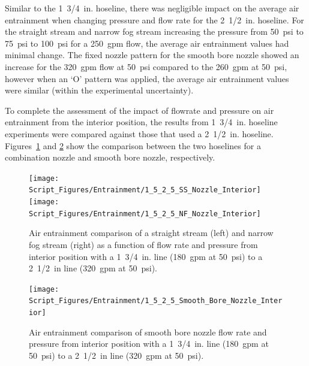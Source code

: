 \documentclass[12pt,oneside]{book}
\begin{document}
Similar to the 1~3/4~in. hoseline, there was negligible impact on the average air entrainment when changing pressure and flow rate for the 2~1/2~in. hoseline. For the straight stream and narrow fog stream increasing the pressure from 50~psi to 75~psi to 100~psi for a 250~gpm flow, the average air entrainment values had minimal change. The fixed nozzle pattern for the smooth bore nozzle showed an increase for the 320~gpm flow at 50~psi compared to the 260~gpm at 50~psi, however when an `O' pattern was applied, the average air entrainment values were similar (within the experimental uncertainty).

To complete the assessment of the impact of flowrate and pressure on air entrainment from the interior position, the results from 1~3/4~in. hoseline experiments were compared against those that used a 2~1/2~in. hoseline. Figures~\ref{fig:SS_NF_1_5_2_5_Int} and \ref{fig:SB_1_5_2_5_Int} show the comparison between the two hoselines for a combination nozzle and smooth bore nozzle, respectively.

\begin{figure}[!ht]
\centering
\texttt{[image: Script\_Figures/Entrainment/1\_5\_2\_5\_SS\_Nozzle\_Interior]}
\texttt{[image: Script\_Figures/Entrainment/1\_5\_2\_5\_NF\_Nozzle\_Interior]}
\caption[Air Entrainment Comparison of Interior Smooth Bore Nozzle from 1~3/4~in Line to 2~1/2~in. Line]{Air entrainment comparison of a straight stream (left) and narrow fog stream (right) as a function of flow rate and pressure from interior position with a 1~3/4~in. line (180~gpm at 50~psi) to a 2~1/2~in line (320~gpm at 50~psi).}
\label{fig:SS_NF_1_5_2_5_Int}
\end{figure}

\begin{figure}[!ht]
\centering
\texttt{[image: Script\_Figures/Entrainment/1\_5\_2\_5\_Smooth\_Bore\_Nozzle\_Interior]}
\caption[Air Entrainment Comparison of Interior Smooth Bore Nozzle from 1~3/4~in Line to 2~1/2~in. Line]{Air entrainment comparison of smooth bore nozzle flow rate and pressure from interior position with a 1~3/4~in. line (180~gpm at 50~psi) to a 2~1/2~in line (320~gpm at 50~psi).}
\label{fig:SB_1_5_2_5_Int}
\end{figure}

\end{document}
